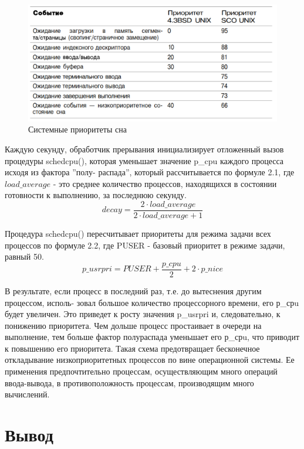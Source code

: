 \begin{figure}[H]
	\begin{center}
		\includegraphics[scale=0.6]{assets/sleep_pr.png}
	\end{center}
	\caption{Системные приоритеты сна}
\end{figure}

Каждую секунду, обработчик прерывания инициализирует отложенный вызов процедуры
schedcpu(), которая уменьшает значение p\_cpu каждого процесса исходя из фактора ”полу-
распада”, который рассчитывается по формуле 2.1, где $load\_average$ - это среднее количество
процессов, находящихся в состоянии готовности к выполнению, за последнюю секунду.
\begin{equation}
	decay = \frac{2 \cdot load\_average}{2\cdot load\_average + 1}
\end{equation}

Процедура schedcpu() пересчитывает приоритеты для режима задачи всех процессов по
формуле 2.2, где PUSER - базовый приоритет в режиме задачи, равный 50.
\begin{equation}
	p\_usrpri = PUSER + \frac{p\_cpu}{2} +  2 \cdot p\_nice
\end{equation}

В результате, если процесс в последний раз, т.е. до вытеснения другим процессом, исполь-
зовал большое количество процессорного времени, его р\_срu будет увеличен. Это приведет
к росту значения p\_usrpri и, следовательно, к понижению приоритета. Чем дольше процесс простаивает в очереди на выполнение, тем больше фактор полураспада уменьшает его
р\_срu, что приводит к повышению его приоритета. Такая схема предотвращает бесконечное
откладывание низкоприоритетных процессов по вине операционной системы. Ее применения
предпочтительно процессам, осуществляющим много операций ввода-вывода, в противоположность процессам, производящим много вычислений.

\chapter{Вывод}

